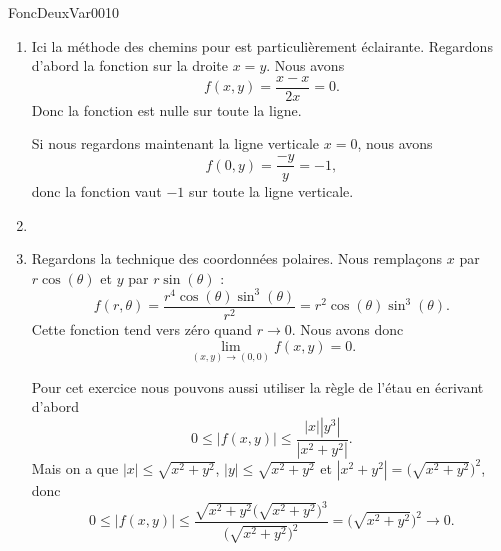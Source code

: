 
\begin{corrige}{FoncDeuxVar0010}

	\begin{enumerate}

		\item
			Ici la méthode des chemins pour est particulièrement éclairante. Regardons d'abord la fonction sur la droite $x=y$. Nous avons
			\begin{equation}
				f(x,y)=\frac{ x-x }{ 2x }=0.
			\end{equation}
			Donc la fonction est nulle sur toute la ligne.

			Si nous regardons maintenant la ligne verticale $x=0$, nous avons
			\begin{equation}
				f(0,y)=\frac{ -y }{ y }=-1,
			\end{equation}
			donc la fonction vaut $-1$ sur toute la ligne verticale.

		\item

		\item
			Regardons la technique des coordonnées polaires. Nous remplaçons $x$ par $r\cos(\theta)$ et $y$ par $r\sin(\theta)$ :
			\begin{equation}
				f(r,\theta)=\frac{ r^4\cos(\theta)\sin^3(\theta) }{ r^2 }=r^2\cos(\theta)\sin^3(\theta).
			\end{equation}
			Cette fonction tend vers zéro quand $r\to 0$. Nous avons donc 
			\begin{equation}
				\lim_{(x,y)\to(0,0)}f(x,y)=0.
			\end{equation}

			Pour cet exercice nous pouvons aussi utiliser la règle de l'étau en écrivant d'abord
			\begin{equation}
				0\leq | f(x,y) |\leq\frac{ | x | |y^3 | }{ | x^2+y^2 | }.
			\end{equation}
			Mais on a que $| x |\leq\sqrt{x^2+y^2}$, $| y |\leq\sqrt{x^2+y^2}$ et $| x^2+y^2 |=\big( \sqrt{x^2+y^2} \big)^2$, donc
			\begin{equation}
				0\leq| f(x,y) |\leq \frac{ \sqrt{x^2+y^2}\big( \sqrt{x^2+y^2} \big)^3 }{ \big( \sqrt{x^2+y^2} \big)^2 }=\big( \sqrt{x^2+y^2} \big)^2\to 0.
			\end{equation}


\end{enumerate}
\end{corrige}
